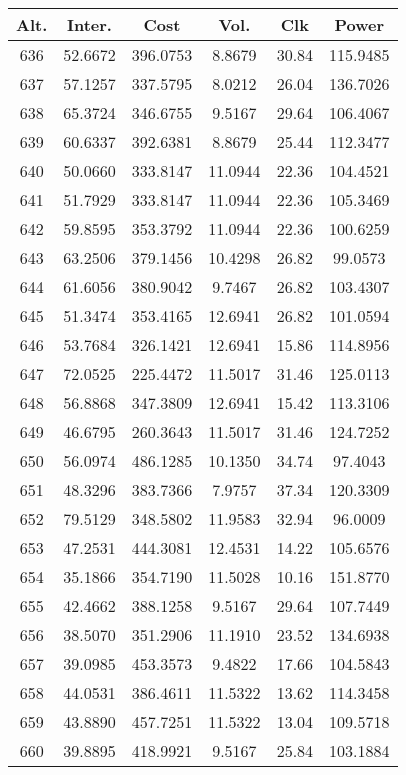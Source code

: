 \begin{center}
\begin{footnotesize}
\begin{tabular}{|c|ccccc|}
\hline
Alt. & Inter. & Cost & Vol. & Clk & Power\\
\hline
636 & 52.6672 & 396.0753 & 8.8679 & 30.84 & 115.9485 \\
637 & 57.1257 & 337.5795 & 8.0212 & 26.04 & 136.7026 \\
638 & 65.3724 & 346.6755 & 9.5167 & 29.64 & 106.4067 \\
639 & 60.6337 & 392.6381 & 8.8679 & 25.44 & 112.3477 \\
640 & 50.0660 & 333.8147 & 11.0944 & 22.36 & 104.4521 \\
641 & 51.7929 & 333.8147 & 11.0944 & 22.36 & 105.3469 \\
642 & 59.8595 & 353.3792 & 11.0944 & 22.36 & 100.6259 \\
643 & 63.2506 & 379.1456 & 10.4298 & 26.82 & 99.0573 \\
644 & 61.6056 & 380.9042 & 9.7467 & 26.82 & 103.4307 \\
645 & 51.3474 & 353.4165 & 12.6941 & 26.82 & 101.0594 \\
646 & 53.7684 & 326.1421 & 12.6941 & 15.86 & 114.8956 \\
647 & 72.0525 & 225.4472 & 11.5017 & 31.46 & 125.0113 \\
648 & 56.8868 & 347.3809 & 12.6941 & 15.42 & 113.3106 \\
649 & 46.6795 & 260.3643 & 11.5017 & 31.46 & 124.7252 \\
650 & 56.0974 & 486.1285 & 10.1350 & 34.74 & 97.4043 \\
651 & 48.3296 & 383.7366 & 7.9757 & 37.34 & 120.3309 \\
652 & 79.5129 & 348.5802 & 11.9583 & 32.94 & 96.0009 \\
653 & 47.2531 & 444.3081 & 12.4531 & 14.22 & 105.6576 \\
654 & 35.1866 & 354.7190 & 11.5028 & 10.16 & 151.8770 \\
655 & 42.4662 & 388.1258 & 9.5167 & 29.64 & 107.7449 \\
656 & 38.5070 & 351.2906 & 11.1910 & 23.52 & 134.6938 \\
657 & 39.0985 & 453.3573 & 9.4822 & 17.66 & 104.5843 \\
658 & 44.0531 & 386.4611 & 11.5322 & 13.62 & 114.3458 \\
659 & 43.8890 & 457.7251 & 11.5322 & 13.04 & 109.5718 \\
660 & 39.8895 & 418.9921 & 9.5167 & 25.84 & 103.1884 \\

\end{tabular}
\end{footnotesize}
\end{center}
